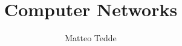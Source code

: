 \documentclass[english,12pt,toc=sections]{HKNdocument}
\begin{document}
\title{Computer Networks}
\author{Matteo Tedde}

\frontmatter
\maketitle
\cclicense
\tableofcontents
\clearpage

\mainmatter





\backmatter


\end{document}
